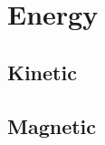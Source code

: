 \documentclass[11pt]{article}
\begin{document}
\section{Energy}


\subsection{Kinetic}

\subsection{Magnetic}

\end{document}
